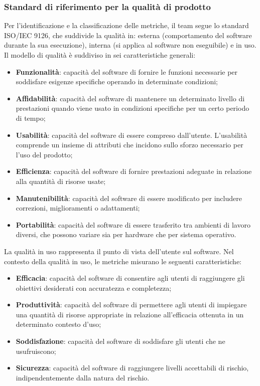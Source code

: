\subsubsection{Standard di riferimento per la qualità di prodotto}
\par Per l'identificazione e la classificazione delle metriche, il team segue lo standard ISO/IEC 9126, che suddivide la qualità in: esterna (comportamento del software durante la sua esecuzione), interna (si applica al software non eseguibile) e in uso. Il modello di qualità è suddiviso in sei caratteristiche generali:
\begin{itemize}
    \item \textbf{Funzionalità}: capacità del software di fornire le funzioni necessarie per soddisfare esigenze specifiche operando in determinate condizioni;
    \item \textbf{Affidabilità}: capacità del software di mantenere un determinato livello di prestazioni quando viene usato in condizioni specifiche per un certo periodo di tempo;
    \item \textbf{Usabilità}: capacità del software di essere compreso dall'utente. L'usabilità comprende un insieme di attributi che incidono sullo sforzo necessario per l'uso del prodotto;
    \item \textbf{Efficienza}: capacità del software di fornire prestazioni adeguate in relazione alla quantità di risorse usate;
    \item \textbf{Manutenibilità}: capacità del software di essere modificato per includere correzioni, miglioramenti o adattamenti;
    \item \textbf{Portabilità}: capacità del software di essere trasferito tra ambienti di lavoro diversi, che possono variare sia per hardware che per sistema operativo.
\end{itemize}

\vspace{0.5\baselineskip}
\par La qualità in uso rappresenta il punto di vista dell'utente sul software. Nel contesto della qualità in uso, le metriche misurano le seguenti caratteristiche:
\begin{itemize}
    \item \textbf{Efficacia}: capacità del software di consentire agli utenti di raggiungere gli obiettivi desiderati con accuratezza e completezza;
    \item \textbf{Produttività}: capacità del software di permettere agli utenti di impiegare una quantità di risorse appropriate in relazione all'efficacia ottenuta in un determinato contesto d'uso;
    \item \textbf{Soddisfazione}: capacità del software di soddisfare gli utenti che ne usufruiscono;
    \item \textbf{Sicurezza}: capacità del software di raggiungere livelli accettabili di rischio, indipendentemente dalla natura del rischio.
\end{itemize}




